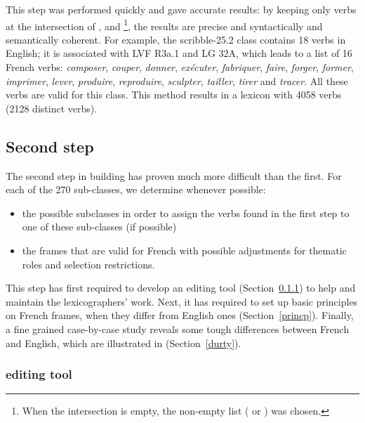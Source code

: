 This step was performed quickly and gave accurate results: by keeping only
verbs at the intersection of \Ltrad{}, \Clvf{} and \Clg{}\footnote{When the
intersection is empty, the non-empty list (\Clvf{} or \Clg{}) was chosen.}, the
results are precise and syntactically and semantically coherent. For example,
the {\color{blue}scribble-25.2} class contains 18 verbs in English; it is
associated with LVF {\color{red}R3a.1} and LG {\color{green}32A},  which leads to a
list of 16 French verbs: \emph{composer}, \emph{couper}, \emph{donner},
\emph{exécuter}, \emph{fabriquer}, \emph{faire}, \emph{forger}, \emph{former},
\emph{imprimer}, \emph{lever}, \emph{produire}, \emph{reproduire},
\emph{sculpter}, \emph{tailler}, \emph{tirer} and \emph{tracer}. All these
verbs are valid for this class.  This method results in a lexicon with 4058
verbs (2128 distinct verbs).



\subsection{Second step}\label{second}

The second step in building \verbenet{} has proven much more difficult than the
first. For each of the 270 \Cf{} sub-classes, we determine whenever possible:

\begin{itemize}

    \item the possible subclasses in order to assign the verbs found in the
    first step to one of these sub-classes (if possible)

    \item the frames that are valid for French with possible adjustments for
    thematic roles and selection restrictions.

\end{itemize}

This step has first required to develop an editing tool
(Section~\ref{toolquentin}) to help and maintain the lexicographers' work.
Next, it has required to set up basic principles on French frames, when they
differ from English ones (Section~\ref{princp}). Finally, a fine grained
case-by-case study reveals some tough differences between French and English,
which are illustrated in (Section~\ref{durty}).


\subsubsection{\verbenet{} editing tool}\label{toolquentin}

